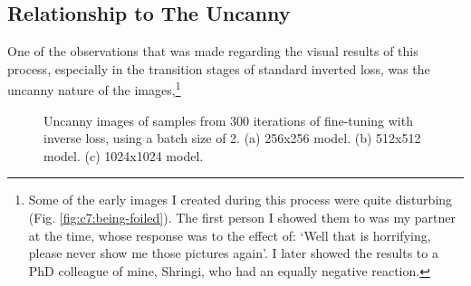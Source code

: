 \subsection{Relationship to The Uncanny}

One of the observations that was made regarding the visual results of this process, especially in the transition stages of standard inverted loss, was the uncanny nature of the images,\footnote{
      Some of the early images I created during this process were quite disturbing (Fig. \ref{fig:c7:being-foiled}). The first person I showed them to was my partner at the time, whose response was to the effect of: `Well that is horrifying, please never show me those pictures again'. I later showed the results to a PhD colleague of mine, Shringi, who had an equally negative reaction.}

\begin{figure}[!htbp]
  \vspace{-60pt}
  \centering
  \hfill
  \hfill
  \caption[Uncanny images of samples from 300 iterations of fine-tuning with inverse loss]{Uncanny images of samples from 300 iterations of fine-tuning with inverse loss, using a batch size of 2. (a) 256x256 model. (b) 512x512 model. (c) 1024x1024 model. }
  \label{fig:c4:uncanny-images-og}
\end{figure}

